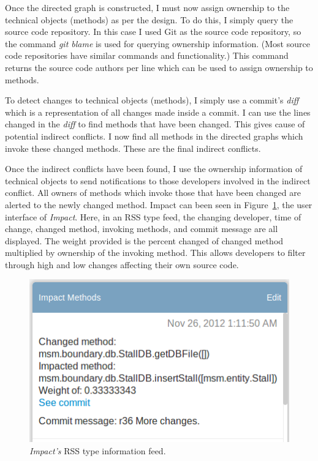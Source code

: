 Once the directed graph is constructed, I must now assign
ownership to the technical objects (methods) as per the design.
To do this, I simply query the source code repository. In this case
I used Git as the source code repository, so the command \textit{git blame}
is used for querying ownership information. (Most source code 
repositories have similar commands and functionality.) This command 
returns the source code authors per line which can be used to assign
ownership to methods.

To detect changes to technical objects (methods), I simply 
use a commit's \textit{diff} which is a representation of all changes
made inside a commit. I can use the lines changed in the \textit{diff} to 
find methods that have been changed. This gives cause of potential
indirect conflicts. 
I now find all methods in the directed graphs which invoke these changed methods. 
These are the final indirect conflicts.

Once the indirect conflicts have been found, I use the
ownership information of technical objects to send notifications to
those developers involved in the indirect conflict. All owners
of methods which invoke those that have been changed are alerted
to the newly changed method. Impact can been seen in
Figure~\ref{fig:impact}, the user interface of \textit{Impact}. Here, in an RSS type
feed, the changing developer, time of change, changed method,
invoking methods, and commit message are all displayed. 
The weight provided is the percent changed of changed method multiplied by 
ownership of the invoking method. This allows developers to filter
through high and low changes affecting their own source code.

\begin{figure}[t!]
\includegraphics[width=\columnwidth]{figures/ImpactDemo}
\caption{\textit{Impact's} RSS type information feed.\label{fig:impact}}
\end{figure}

